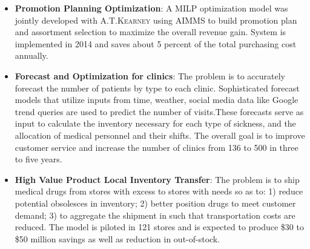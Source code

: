 \documentclass[12pt,letterpaper,roman]{moderncv} %
\begin{document}
\bigskip
{}
{} %
{

\begin{itemize}
\item \textbf{Promotion Planning Optimization}: A MILP optimization model was
jointly developed with \textsc{A.T.Kearney} using AIMMS to build promotion plan and
assortment selection to maximize the overall revenue gain. System is
implemented in 2014 and saves about 5 percent of the total purchasing cost annually.
\item \textbf{Forecast and Optimization for clinics}: The problem is
to accurately forecast the number of patients by type to each clinic.
Sophisticated forecast models that utilize inputs from time, weather, social
media data like Google trend queries are used to predict the number of
visits.These forecasts serve as input to calculate the inventory necessary for
each type of sickness, and the allocation of medical personnel and their
shifts. The overall goal is to improve customer service and increase the number
of clinics from 136 to 500 in three to five years.
\item \textbf{High Value Product Local Inventory Transfer}:  The problem is to ship 
medical drugs from stores with excess to stores with needs so as to: 1) reduce
potential obsolesces in inventory; 2) better position drugs to meet customer
demand; 3) to aggregate the shipment in such that transportation costs are
reduced. The model is piloted in 121 stores and is expected
to produce \$30 to \$50 million savings as well as reduction in
out-of-stock.
 


\end{itemize}

}
\end{document}
